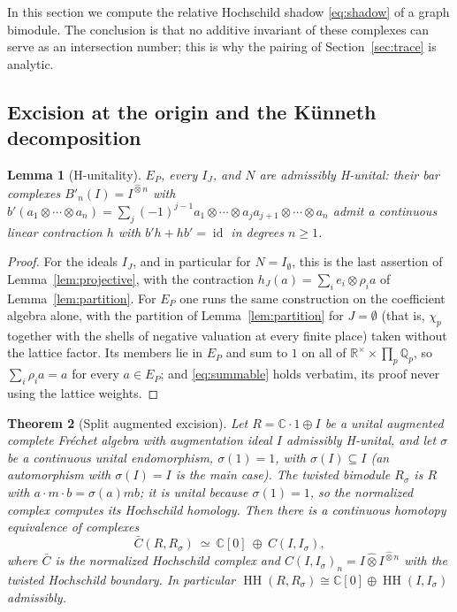 \documentclass[11pt]{amsart}
\newtheorem{theorem}{Theorem}[section]
\newtheorem{lemma}[theorem]{Lemma}
\theoremstyle{definition}
\theoremstyle{remark}
\newcommand{\C}{\mathbb C}
\newcommand{\R}{\mathbb R}
\newcommand{\Q}{\mathbb Q}
\newcommand{\id}{\operatorname{id}}
\newcommand{\HH}{\operatorname{HH}}
\begin{document}
In this section we compute the relative Hochschild shadow \eqref{eq:shadow} of
a graph bimodule.  The conclusion is that no additive invariant of these
complexes can serve as an intersection number; this is why the pairing of
Section~\ref{sec:trace} is analytic.

\subsection{Excision at the origin and the K\"unneth decomposition}

\begin{lemma}[H-unitality]\label{lem:hunital}
$E_P$, every $I_J$, and $N$ are admissibly H-unital: their bar complexes
$B'_n(I)=I^{\widehat\otimes n}$ with
$b'(a_1\otimes\cdots\otimes a_n)=\sum_j(-1)^{j-1}a_1\otimes\cdots\otimes
a_ja_{j+1}\otimes\cdots\otimes a_n$ admit a continuous linear contraction $h$
with $b'h+hb'=\id$ in degrees $n\ge1$.
\end{lemma}

\begin{proof}
For the ideals $I_J$, and in particular for $N=I_{\emptyset}$, this is the
last assertion of Lemma~\ref{lem:projective}, with the contraction
$h_J(a)=\sum_ie_i\otimes\rho_ia$ of Lemma~\ref{lem:partition}.  For $E_P$ one
runs the same construction on the coefficient algebra alone, with the
partition of Lemma~\ref{lem:partition} for $J=\emptyset$ (that is, $\chi_p$
together with the shells of negative valuation at every finite place) taken
without the lattice factor.  Its members lie in $E_P$ and sum to $1$ on all of
$\R^{\times}\times\prod_p\Q_p$, so $\sum_i\rho_ia=a$ for every $a\in E_P$;
and \eqref{eq:summable} holds verbatim, its proof never using the lattice
weights.
\end{proof}

\begin{theorem}[Split augmented excision]\label{thm:B2}
Let $R=\C\cdot1\oplus I$ be a unital augmented complete Fr\'echet algebra with
augmentation ideal $I$ admissibly H-unital, and let $\sigma$ be a continuous
unital endomorphism, $\sigma(1)=1$, with $\sigma(I)\subseteq I$ (an
automorphism with $\sigma(I)=I$ is the main case).  The twisted bimodule
$R_{\sigma}$ is $R$ with $a\cdot m\cdot b=\sigma(a)mb$; it is unital because
$\sigma(1)=1$, so the normalized complex computes its Hochschild homology.  Then there is a continuous
homotopy equivalence of complexes
\[
\bar C(R,R_{\sigma})\ \simeq\ \C[0]\ \oplus\ C(I,I_{\sigma}),
\]
where $\bar C$ is the normalized Hochschild complex and
$C(I,I_{\sigma})_n=I\widehat\otimes I^{\widehat\otimes n}$ with the twisted
Hochschild boundary.  In particular
$\HH(R,R_{\sigma})\cong\C[0]\oplus\HH(I,I_{\sigma})$ admissibly.
\end{theorem}
\end{document}
